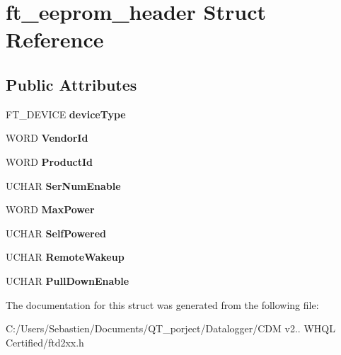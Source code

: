 \hypertarget{structft__eeprom__header}{}\section{ft\+\_\+eeprom\+\_\+header Struct Reference}
\label{structft__eeprom__header}
\subsection*{Public Attributes}
\begin{DoxyCompactItemize}
\item 
\mbox{\label{structft__eeprom__header_a3b27d86c243b51e47e6c279f0ef56251}} 
F\+T\+\_\+\+D\+E\+V\+I\+CE {\bfseries device\+Type}
\item 
\mbox{\label{structft__eeprom__header_a63538171dfe221e65f0bd27938239c30}} 
W\+O\+RD {\bfseries Vendor\+Id}
\item 
\mbox{\label{structft__eeprom__header_a342079ae92d0b71e0e71bde526ded445}} 
W\+O\+RD {\bfseries Product\+Id}
\item 
\mbox{\label{structft__eeprom__header_a04737398a9c4f758975303df5f0430e6}} 
U\+C\+H\+AR {\bfseries Ser\+Num\+Enable}
\item 
\mbox{\label{structft__eeprom__header_a28ce835ee57a5f21794798f64022d89b}} 
W\+O\+RD {\bfseries Max\+Power}
\item 
\mbox{\label{structft__eeprom__header_a98fe9504d952d4d579dd8d047a70d175}} 
U\+C\+H\+AR {\bfseries Self\+Powered}
\item 
\mbox{\label{structft__eeprom__header_a923b8578325e21645cc18b54784966f4}} 
U\+C\+H\+AR {\bfseries Remote\+Wakeup}
\item 
\mbox{\label{structft__eeprom__header_a3a9b620423c2d0d1f452269c255f4209}} 
U\+C\+H\+AR {\bfseries Pull\+Down\+Enable}
\end{DoxyCompactItemize}


The documentation for this struct was generated from the following file\+:\begin{DoxyCompactItemize}
\item 
C\+:/\+Users/\+Sebastien/\+Documents/\+Q\+T\+\_\+porject/\+Datalogger/\+C\+D\+M v2.. W\+H\+Q\+L Certified/ftd2xx.\+h\end{DoxyCompactItemize}

